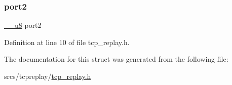 \subsubsection{\texorpdfstring{port2}{port2}}
{\footnotesize\ttfamily \hyperlink{asm__types_8h_a77f8102529baef48621b98012524115d}{\+\_\+\+\_\+u8} port2}



Definition at line 10 of file tcp\+\_\+replay.\+h.



The documentation for this struct was generated from the following file\+:\begin{DoxyCompactItemize}
\item 
srcs/tcpreplay/\hyperlink{tcp__replay_8h}{tcp\+\_\+replay.\+h}\end{DoxyCompactItemize}
